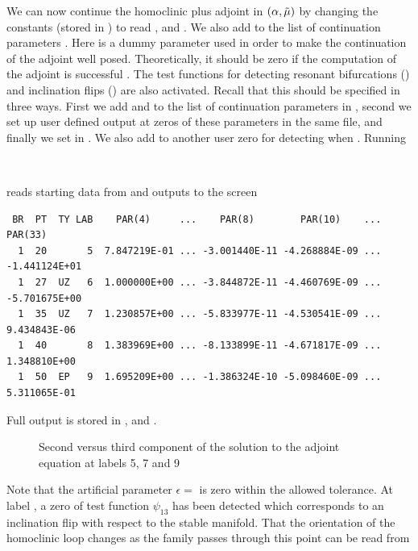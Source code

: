 \documentclass[12pt]{report}
\begin{document}
We can now continue the homoclinic plus
adjoint in $(\alpha,\tilde \mu)$  by
changing the constants (stored in ) to read
,  and .
We also add  to the list of continuation parameters
. Here  is a dummy parameter used in
order to make the continuation of the adjoint well posed. Theoretically,
it should be zero if the computation of the adjoint is successful
\cite{Sa:95b}.
The test functions for detecting resonant bifurcations 
() and inclination flips () are
also activated. Recall that this should be specified in
three ways. First we add  and 
to the list of continuation parameters in , second we set up user defined
output at zeros of these parameters in the same file, and finally we set 
 in . We also add to  another user zero
for detecting when .
Running 
\begin{center}
\\
\end{center}
reads starting data from  and outputs to the screen
\begin{verbatim}
 BR  PT  TY LAB    PAR(4)     ...    PAR(8)        PAR(10)    ...    PAR(33)    
  1  20       5  7.847219E-01 ... -3.001440E-11 -4.268884E-09 ... -1.441124E+01
  1  27  UZ   6  1.000000E+00 ... -3.844872E-11 -4.460769E-09 ... -5.701675E+00
  1  35  UZ   7  1.230857E+00 ... -5.833977E-11 -4.530541E-09 ...  9.434843E-06
  1  40       8  1.383969E+00 ... -8.133899E-11 -4.671817E-09 ...  1.348810E+00
  1  50  EP   9  1.695209E+00 ... -1.386324E-10 -5.098460E-09 ...  5.311065E-01
\end{verbatim}
Full output is stored in ,  and . 
\begin{figure}[b]
\epsfysize 9.0cm
\centerline{}
\caption{Second versus third component of the solution to the adjoint
equation at labels 5, 7 and 9}
\label{Ftest1}
\end{figure}
Note that the artificial parameter $\epsilon=$ is zero within
the allowed tolerance. At label , a zero of test function $\psi_{13}$ has
been detected which corresponds to an inclination flip with respect to
the stable manifold. That the orientation of the homoclinic loop
changes as the family passes through this point can be read from
\end{document}
